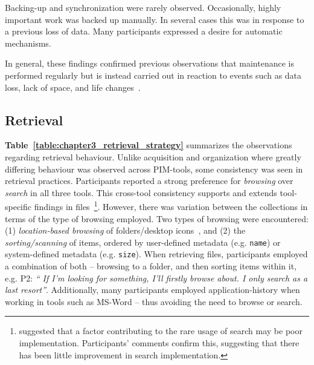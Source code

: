 Backing-up and synchronization were rarely observed.  Occasionally, highly important work was backed up manually.  In several cases this was in response to a previous loss of data.  Many participants expressed a desire for automatic mechanisms.

In general, these findings confirmed previous observations that maintenance is performed regularly but is instead carried out in reaction to events such as data loss, lack of space, and life changes~\citep{barreau:95}.




\subsection{Retrieval}
\label{exp-study:comparison-retrieval}

\textbf{Table~\ref{table:chapter3_retrieval_strategy}} summarizes the observations regarding retrieval behaviour.
Unlike acquisition and organization where greatly differing behaviour was observed across PIM-tools, some consistency was seen in retrieval practices. 
Participants reported a strong preference for \textit{browsing} over \textit{search} in all three tools. This cross-tool consistency supports and extends tool-specific findings in files~\citep{bn:95}\footnote{\citet{Gelernter:96b} suggested that a factor contributing to the rare usage of search may be poor implementation.  Participants' comments confirm this, suggesting that there has been little improvement in search implementation.}.  However, there was variation between the collections in terms of the type of browsing employed. Two types of browsing were encountered: (1) \textit{location-based browsing} of folders/desktop icons~\citep{bn:95}, and (2) the \textit{sorting/scanning} of items, ordered by user-defined metadata (e.g. \texttt{name}) or system-defined metadata (e.g. \texttt{size}).
When retrieving files, participants employed a combination of both -- browsing to a folder, and then sorting items within it, e.g. P2: \textit{`` If I'm looking for something, I'll firstly browse about.  I only search as a last resort''}. Additionally, many participants employed application-history when working in tools such as MS-Word -- thus avoiding the need to browse or search.



